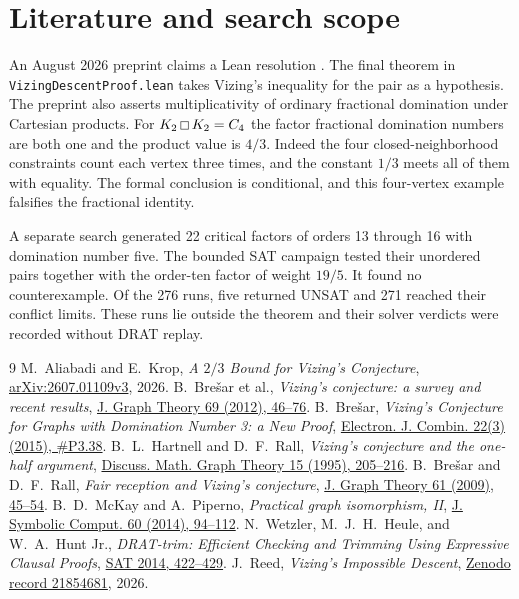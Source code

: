 \documentclass[10pt]{article}
\newcommand{\gp}{\mathbin{\vcenter{\hbox{\setlength{\fboxsep}{0pt}%
  \fbox{\rule{0pt}{.51em}\rule{.51em}{0pt}}}}}}
\begin{document}
\section{Literature and search scope}

An August 2026 preprint claims a Lean resolution \cite{reed}. The final
theorem in \texttt{VizingDescentProof.lean} takes Vizing's inequality
for the pair as a hypothesis. The preprint also asserts
multiplicativity of ordinary fractional domination under Cartesian products.
For \(K_2\gp K_2=C_4\) the factor fractional domination numbers are both
one and the product value is \(4/3\). Indeed the four closed-neighborhood
constraints count each vertex three times, and the constant \(1/3\)
meets all of them with equality. The formal conclusion is conditional,
and this four-vertex example falsifies the fractional identity.

A separate search generated 22 critical factors of orders 13 through 16
with domination number five. The bounded SAT campaign tested their unordered
pairs together with the order-ten factor of weight \(19/5\). It found no
counterexample. Of the 276 runs, five returned UNSAT and 271 reached their
conflict limits. These runs lie outside the theorem and their solver
verdicts were recorded without DRAT replay.

\begin{thebibliography}{9}
M.~Aliabadi and E.~Krop,
\emph{A \(2/3\) Bound for Vizing's Conjecture},
\href{https://arxiv.org/abs/2607.01109v3}{arXiv:2607.01109v3}, 2026.
B.~Bre\v{s}ar et al.,
\emph{Vizing's conjecture: a survey and recent results},
\href{https://doi.org/10.1002/jgt.20565}{J. Graph Theory 69 (2012), 46--76}.
B.~Bre\v{s}ar, \emph{Vizing's Conjecture for Graphs with Domination Number 3:
a New Proof},
\href{https://doi.org/10.37236/5182}{Electron. J. Combin. 22(3) (2015), \#P3.38}.
B.~L.~Hartnell and D.~F.~Rall,
\emph{Vizing's conjecture and the one-half argument},
\href{https://doi.org/10.7151/dmgt.1018}{Discuss. Math. Graph Theory 15 (1995), 205--216}.
B.~Bre\v{s}ar and D.~F.~Rall,
\emph{Fair reception and Vizing's conjecture},
\href{https://doi.org/10.1002/jgt.20366}{J. Graph Theory 61 (2009), 45--54}.
B.~D.~McKay and A.~Piperno, \emph{Practical graph isomorphism, II},
\href{https://doi.org/10.1016/j.jsc.2013.09.003}{J. Symbolic Comput. 60 (2014), 94--112}.
N.~Wetzler, M.~J.~H.~Heule, and W.~A.~Hunt Jr.,
\emph{DRAT-trim: Efficient Checking and Trimming Using Expressive Clausal Proofs},
\href{https://doi.org/10.1007/978-3-319-09284-3_31}{SAT 2014, 422--429}.
J.~Reed, \emph{Vizing's Impossible Descent},
\href{https://zenodo.org/records/21854681}{Zenodo record 21854681}, 2026.
\end{thebibliography}
\end{document}
